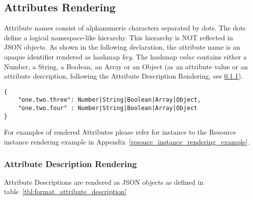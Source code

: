 \documentclass[10pt,a4paper]{article}
\begin{document}
\subsection{Attributes Rendering}

Attribute names consist of alphanumeric characters separated by dots. The dots
define a logical namespace-like hierarchy. This hierarchy is NOT reflected in JSON
objects. As shown in the following declaration, the attribute name is an opaque
identifier rendered as hashmap \textit{key}. The hashmap \textit{value} contains either a
Number, a String, a Boolean, an Array or an Object (as an attribute value or an attribute
description, following the Attribute Description Rendering, see \ref{sec:format_attribute_description}).
\begin{lstlisting}
{
    "one.two.three": Number|String|Boolean|Array|Object,
    "one.two.four" : Number|String|Boolean|Array|Object
}
\end{lstlisting}

For examples of rendered Attributes please refer for instance to the Resource instance rendering example in Appendix~\ref{resouce_instance_rendering_example}.


\subsubsection{Attribute Description Rendering}
\label{sec:format_attribute_description}

Attribute Descriptions are rendered as JSON objects as defined in table~\ref{tbl:format_attribute_description}
\end{document}

